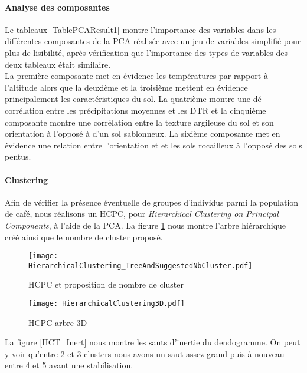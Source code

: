 \paragraph{Analyse des composantes} Le tableaux \ref{TablePCAResult1} montre l'importance des variables dans les différentes composantes de la PCA réalisée avec un  jeu de variables simplifié pour plus de lisibilité, après vérification que l'importance des types de variables des deux tableaux était similaire. \\

\noindent La première composante met en évidence les températures par rapport à l'altitude alors que la deuxième et la troisième mettent en évidence principalement les caractéristiques du sol. La quatrième montre une dé-corrélation entre les précipitations moyennes et les DTR et la cinquième composante montre une corrélation entre la texture argileuse du sol et son orientation à l'opposé à d'un sol sablonneux. La sixième composante met en évidence une relation entre l'orientation et et les sols rocailleux à l'opposé des sols pentus. 



\paragraph{Clustering} Afin de vérifier la présence éventuelle de groupes d'individus parmi la population de café, nous réalisons un HCPC, pour \textit{Hierarchical Clustering on Principal Components}, à l'aide de la PCA. La figure \ref{HCT_Suggest} nous montre l'arbre hiérarchique créé ainsi que le nombre de cluster proposé. \\

\begin{figure}[H]
	\texttt{[image: HierarchicalClustering\_TreeAndSuggestedNbCluster.pdf]}
	\caption{\label{HCT_Suggest} HCPC et proposition de nombre de cluster }
\end{figure}



\begin{figure}[H]
	\texttt{[image: HierarchicalClustering3D.pdf]}
	\caption{\label{HCT_3d} HCPC arbre 3D}
\end{figure}


\noindent La figure \ref{HCT_Inert} nous montre les sauts d'inertie du dendogramme. On peut y voir qu'entre 2 et 3 clusters nous avons un saut assez grand puis à nouveau entre 4 et 5 avant une stabilisation. 


